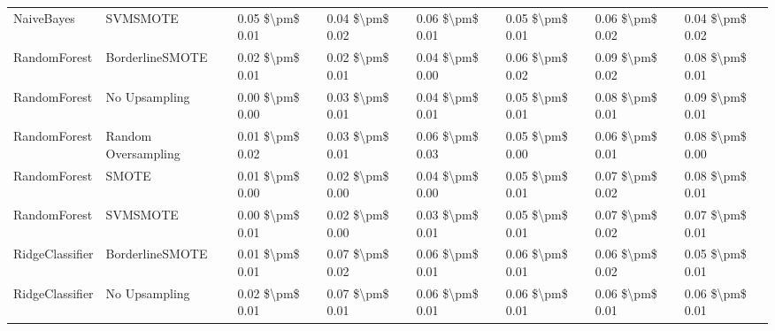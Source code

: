 \begin{tabular}{llllllll}
                     NaiveBayes &                      SVMSMOTE & 0.05 \$\textbackslash pm\$ 0.01 &           0.04 \$\textbackslash pm\$ 0.02 &       0.06 \$\textbackslash pm\$ 0.01 &        0.05 \$\textbackslash pm\$ 0.01 &                         0.06 \$\textbackslash pm\$ 0.02 &     0.04 \$\textbackslash pm\$ 0.02 \\
                   RandomForest &               BorderlineSMOTE & 0.02 \$\textbackslash pm\$ 0.01 &           0.02 \$\textbackslash pm\$ 0.01 &       0.04 \$\textbackslash pm\$ 0.00 &        0.06 \$\textbackslash pm\$ 0.02 &                         0.09 \$\textbackslash pm\$ 0.02 &     0.08 \$\textbackslash pm\$ 0.01 \\
                   RandomForest &                 No Upsampling & 0.00 \$\textbackslash pm\$ 0.00 &           0.03 \$\textbackslash pm\$ 0.01 &       0.04 \$\textbackslash pm\$ 0.01 &        0.05 \$\textbackslash pm\$ 0.01 &                         0.08 \$\textbackslash pm\$ 0.01 &     0.09 \$\textbackslash pm\$ 0.01 \\
                   RandomForest &           Random Oversampling & 0.01 \$\textbackslash pm\$ 0.02 &           0.03 \$\textbackslash pm\$ 0.01 &       0.06 \$\textbackslash pm\$ 0.03 &        0.05 \$\textbackslash pm\$ 0.00 &                         0.06 \$\textbackslash pm\$ 0.01 &     0.08 \$\textbackslash pm\$ 0.00 \\
                   RandomForest &                         SMOTE & 0.01 \$\textbackslash pm\$ 0.00 &           0.02 \$\textbackslash pm\$ 0.00 &       0.04 \$\textbackslash pm\$ 0.00 &        0.05 \$\textbackslash pm\$ 0.01 &                         0.07 \$\textbackslash pm\$ 0.02 &     0.08 \$\textbackslash pm\$ 0.01 \\
                   RandomForest &                      SVMSMOTE & 0.00 \$\textbackslash pm\$ 0.01 &           0.02 \$\textbackslash pm\$ 0.00 &       0.03 \$\textbackslash pm\$ 0.01 &        0.05 \$\textbackslash pm\$ 0.01 &                         0.07 \$\textbackslash pm\$ 0.02 &     0.07 \$\textbackslash pm\$ 0.01 \\
                RidgeClassifier &               BorderlineSMOTE & 0.01 \$\textbackslash pm\$ 0.01 &           0.07 \$\textbackslash pm\$ 0.02 &       0.06 \$\textbackslash pm\$ 0.01 &        0.06 \$\textbackslash pm\$ 0.01 &                         0.06 \$\textbackslash pm\$ 0.02 &     0.05 \$\textbackslash pm\$ 0.01 \\
                RidgeClassifier &                 No Upsampling & 0.02 \$\textbackslash pm\$ 0.01 &           0.07 \$\textbackslash pm\$ 0.01 &       0.06 \$\textbackslash pm\$ 0.01 &        0.06 \$\textbackslash pm\$ 0.01 &                         0.06 \$\textbackslash pm\$ 0.01 &     0.06 \$\textbackslash pm\$ 0.01 \\

\end{tabular}
